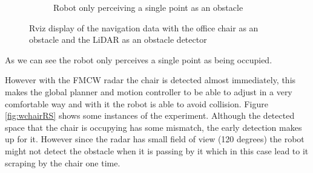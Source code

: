 \begin{figure}[ht!]
\begin{subfigure}[t]{0.49\linewidth}
    \caption{Robot only perceiving a single point as an obstacle}
    \label{fig::rvizwchairscan2}
  \end{subfigure}
  \caption{Rviz display of the navigation data with the office chair as an obstacle and the \ac{LiDAR} as an obstacle detector}
  \label{fig::rvizwchairscan}
\end{figure}
 As we can see the robot only perceives a single point as being occupied.

However with the \ac{FMCW} radar the chair is detected almost immediately, this makes the global planner and motion controller to be able to adjust in a very comfortable way and with it the robot is able to avoid collision. Figure \ref{fig:wchairRS} shows some instances of the experiment. Although the detected space that the chair is occupying has some mismatch, the early detection makes up for it. However since the radar has small field of view (120 degrees) the robot might not detect the obstacle when it is passing by it which in this case lead to it scraping by the chair one time.

